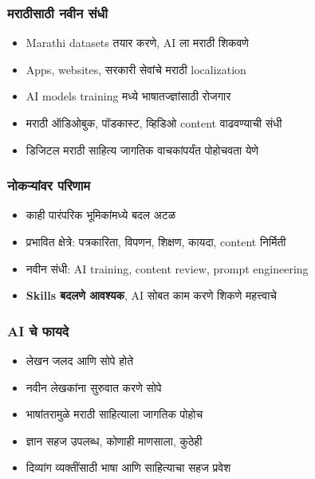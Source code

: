 \begin{frame}[fragile]\frametitle{मराठीसाठी नवीन संधी}

\begin{itemize}
\item Marathi datasets तयार करणे, AI ला मराठी शिकवणे
\item Apps, websites, सरकारी सेवांचे मराठी localization
\item AI models training मध्ये भाषातज्ज्ञांसाठी रोजगार
\item मराठी ऑडिओबुक, पॉडकास्ट, व्हिडिओ content वाढवण्याची संधी
\item डिजिटल मराठी साहित्य जागतिक वाचकांपर्यंत पोहोचवता येणे
\end{itemize}

\end{frame}

\begin{frame}[fragile]\frametitle{नोकऱ्यांवर परिणाम}

\begin{itemize}
\item काही पारंपरिक भूमिकांमध्ये बदल अटळ
\item प्रभावित क्षेत्रे: पत्रकारिता, विपणन, शिक्षण, कायदा, content निर्मिती
\item नवीन संधी: AI training, content review, prompt engineering
\item \textbf{Skills बदलणे आवश्यक}, AI सोबत काम करणे शिकणे महत्त्वाचे
\end{itemize}

\end{frame}

\begin{frame}[fragile]\frametitle{AI चे फायदे}

\begin{itemize}
\item लेखन जलद आणि सोपे होते
\item नवीन लेखकांना सुरुवात करणे सोपे
\item भाषांतरामुळे मराठी साहित्याला जागतिक पोहोच
\item ज्ञान सहज उपलब्ध, कोणाही माणसाला, कुठेही
\item दिव्यांग व्यक्तींसाठी भाषा आणि साहित्याचा सहज प्रवेश
\end{itemize}

\end{frame}


